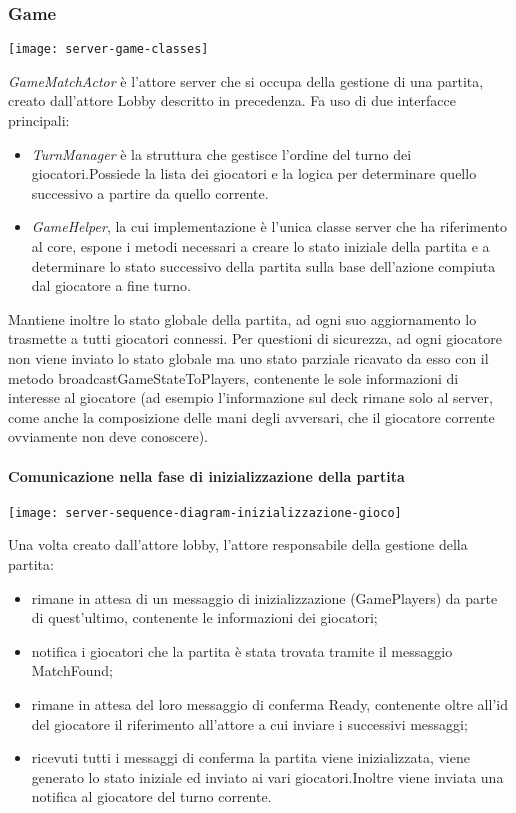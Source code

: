 \subsubsection{Game}
\begin{center}
    \texttt{[image: server-game-classes]}
\end{center}
\textit{GameMatchActor} è l’attore server che si occupa della gestione di una partita, creato dall’attore Lobby descritto in precedenza.
Fa uso di due interfacce principali:
\begin{itemize}
    \item \textit{TurnManager} è la struttura che gestisce l'ordine del turno dei giocatori.Possiede la lista dei giocatori e la logica per determinare quello successivo a partire da quello corrente.
    \item \textit{GameHelper}, la cui implementazione è l’unica classe server che ha riferimento al core, espone i metodi necessari a creare lo stato iniziale della partita e a determinare lo stato successivo della partita sulla base dell’azione compiuta dal giocatore a fine turno.
\end{itemize}
Mantiene inoltre lo stato globale della partita, ad ogni suo aggiornamento lo trasmette a tutti giocatori connessi.
Per questioni di sicurezza, ad ogni giocatore non viene inviato lo stato globale ma uno stato parziale ricavato da esso con il metodo broadcastGameStateToPlayers, contenente le sole informazioni di interesse al giocatore (ad esempio l’informazione sul deck rimane solo al server, come anche la composizione delle mani degli avversari, che il giocatore corrente ovviamente non deve conoscere).

\paragraph{Comunicazione nella fase di inizializzazione della partita}
\begin{center}
    \texttt{[image: server-sequence-diagram-inizializzazione-gioco]}
\end{center}
Una volta creato dall’attore lobby, l’attore responsabile della gestione della partita:
\begin{itemize}
    \item rimane in attesa di un messaggio di inizializzazione (GamePlayers) da parte di quest’ultimo, contenente le informazioni dei giocatori;
    \item notifica i giocatori che la partita è stata trovata tramite il messaggio MatchFound;
    \item rimane in attesa del loro messaggio di conferma Ready, contenente oltre all’id del giocatore il riferimento all’attore a cui inviare i successivi messaggi;
    \item ricevuti tutti i messaggi di conferma la partita viene inizializzata, viene generato lo stato iniziale ed inviato ai vari giocatori.Inoltre viene inviata una notifica al giocatore del turno corrente.
\end{itemize}
\newpage
